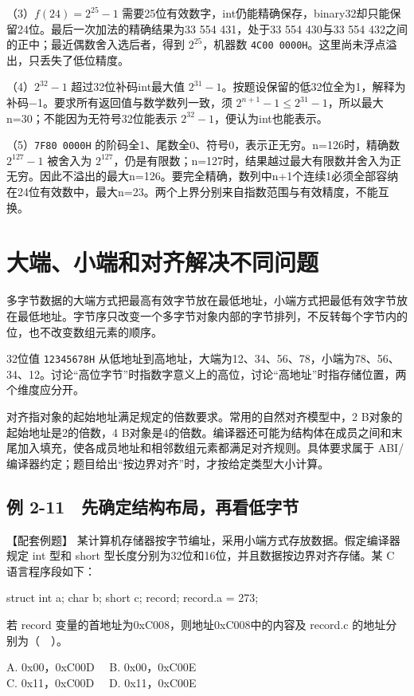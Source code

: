 （3）\(f(24)=2^{25}-1\) 需要25位有效数字，int仍能精确保存，binary32却只能保留24位。最后一次加法的精确结果为33 554 431，处于33 554 430与33 554 432之间的正中；最近偶数舍入选后者，得到 \(2^{25}\)，机器数 \texttt{4C00 0000H}。这里尚未浮点溢出，只丢失了低位精度。

（4）\(2^{32}-1\) 超过32位补码int最大值 \(2^{31}-1\)。按题设保留的低32位全为1，解释为补码\ensuremath{-}1。要求所有返回值与数学数列一致，须 \(2^{n+1}-1\le2^{31}-1\)，所以最大n=30；不能因为无符号32位能表示 \(2^{32}-1\)，便认为int也能表示。

（5）\texttt{7F80 0000H} 的阶码全1、尾数全0、符号0，表示正无穷。n=126时，精确数 \(2^{127}-1\) 被舍入为 \(2^{127}\)，仍是有限数；n=127时，结果越过最大有限数并舍入为正无穷。因此不溢出的最大n=126。要完全精确，数列中n+1个连续1必须全部容纳在24位有效数中，最大n=23。两个上界分别来自指数范围与有效精度，不能互换。

\section{大端、小端和对齐解决不同问题}\label{CO02-25}

多字节数据的大端方式把最高有效字节放在最低地址，小端方式把最低有效字节放在最低地址。字节序只改变一个多字节对象内部的字节排列，不反转每个字节内的位，也不改变数组元素的顺序。

32位值 \texttt{12345678H} 从低地址到高地址，大端为12、34、56、78，小端为78、56、34、12。讨论``高位字节''时指数字意义上的高位，讨论``高地址''时指存储位置，两个维度应分开。

对齐指对象的起始地址满足规定的倍数要求。常用的自然对齐模型中，2 B对象的起始地址是2的倍数，4 B对象是4的倍数。编译器还可能为结构体在成员之间和末尾加入填充，使各成员地址和相邻数组元素都满足对齐规则。具体要求属于 ABI/编译器约定；题目给出``按边界对齐''时，才按给定类型大小计算。

\subsection{例 2-11　先确定结构布局，再看低字节}\label{CO02-26}

\begin{example}[配套例题]

【配套例题】 某计算机存储器按字节编址，采用小端方式存放数据。假定编译器规定 int 型和 short 型长度分别为32位和16位，并且数据按边界对齐存储。某 C 语言程序段如下：

\par\medskip\noindent\begin{minipage}{\linewidth}
\begin{codeblock}[language=C]
struct {
    int a;
    char b;
    short c;
} record;
record.a = 273;
\end{codeblock}
\end{minipage}\par\medskip

若 record 变量的首地址为0xC008，则地址0xC008中的内容及 record.c 的地址分别为（　）。

A. 0x00，0xC00D　 B. 0x00，0xC00E\\
C. 0x11，0xC00D　 D. 0x11，0xC00E

\end{example}

